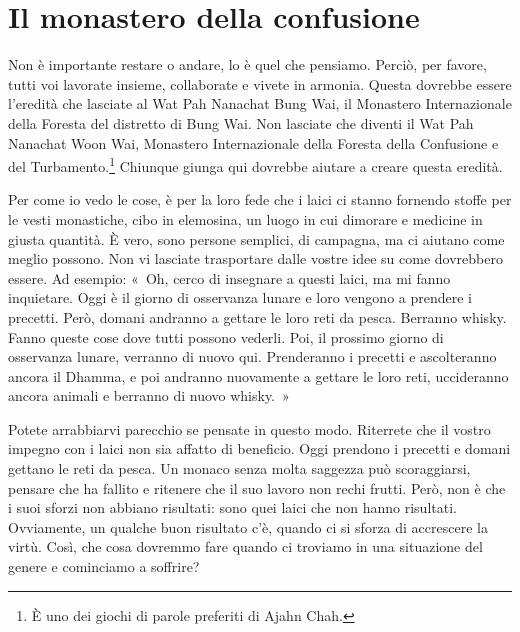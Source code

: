 \chapter{Il monastero della confusione}

Non è importante restare o andare, lo è quel che pensiamo. Perciò, per
favore, tutti voi lavorate insieme, collaborate e vivete in armonia.
Questa dovrebbe essere l'eredità che lasciate al Wat Pah Nanachat Bung
Wai, il Monastero Internazionale della Foresta del distretto di Bung
Wai. Non lasciate che diventi il Wat Pah Nanachat Woon Wai, Monastero
Internazionale della Foresta della Confusione e del
Turbamento.\footnote{È uno dei giochi di parole preferiti di Ajahn Chah.}
Chiunque giunga qui dovrebbe aiutare a creare questa eredità.

Per come io vedo le cose, è per la loro fede che i laici ci stanno
fornendo stoffe per le vesti monastiche, cibo in elemosina, un luogo in
cui dimorare e medicine in giusta quantità. È vero, sono persone
semplici, di campagna, ma ci aiutano come meglio possono. Non vi
lasciate trasportare dalle vostre idee su come dovrebbero essere. Ad
esempio: «~Oh, cerco di insegnare a questi laici, ma mi fanno
inquietare. Oggi è il giorno di osservanza lunare e loro vengono a
prendere i precetti. Però, domani andranno a gettare le loro reti da
pesca. Berranno whisky. Fanno queste cose dove tutti possono vederli.
Poi, il prossimo giorno di osservanza lunare, verranno di nuovo qui.
Prenderanno i precetti e ascolteranno ancora il Dhamma, e poi andranno
nuovamente a gettare le loro reti, uccideranno ancora animali e berranno
di nuovo whisky.~»

Potete arrabbiarvi parecchio se pensate in questo modo. Riterrete che il
vostro impegno con i laici non sia affatto di beneficio. Oggi prendono i
precetti e domani gettano le reti da pesca. Un monaco senza molta
saggezza può scoraggiarsi, pensare che ha fallito e ritenere che il suo
lavoro non rechi frutti. Però, non è che i suoi sforzi non abbiano
risultati: sono quei laici che non hanno risultati. Ovviamente, un
qualche buon risultato c'è, quando ci si sforza di accrescere la virtù.
Così, che cosa dovremmo fare quando ci troviamo in una situazione del
genere e cominciamo a soffrire?

